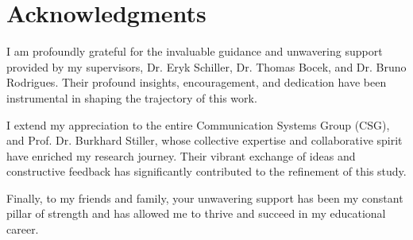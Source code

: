 \chapter*{Acknowledgments}
I am profoundly grateful for the invaluable guidance and unwavering support provided by my supervisors, Dr. Eryk Schiller, Dr. Thomas Bocek, and Dr. Bruno Rodrigues. Their profound insights, encouragement, and dedication have been instrumental in shaping the trajectory of this work.

I extend my appreciation to the entire Communication Systems Group (CSG), and Prof. Dr. Burkhard Stiller, whose collective expertise and collaborative spirit have enriched my research journey. Their vibrant exchange of ideas and constructive feedback has significantly contributed to the refinement of this study.

Finally, to my friends and family, your unwavering support has been my constant pillar of strength and has allowed me to thrive and succeed in my educational career.
